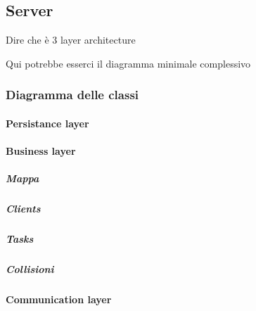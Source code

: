 \subsection{Server}

Dire che è 3 layer architecture

Qui potrebbe esserci il diagramma minimale complessivo


\subsubsection{Diagramma delle classi}


\paragraph{Persistance layer}


\paragraph{Business layer}

\subparagraph{Mappa}

\subparagraph{Clients}

\subparagraph{Tasks}

\subparagraph{Collisioni}


\paragraph{Communication layer}
